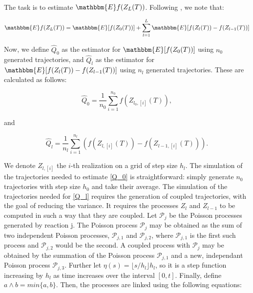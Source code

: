 \documentclass[ugrad,lot,lof,openright,11pt,oneside,onehalfspace]{RUthesis}
\begin{document}
		\\
		The task is to estimate $\mathbbm{E}f(Z_L(T))$. Following \cite{mlmc_applications}, we note that:

		\begin{equation}\label{telescope}
		\mathbbm{E}f(Z_L(T)) = \mathbbm{E} [ f(Z_0(T)) ] + \sum\limits_{l=1}^{L} \mathbbm{E} [ f(Z_l(T)) - f(Z_{l-1}(T))]
		\end{equation}

		\noindent
		Now, we define $\widehat{Q}_0$ as the estimator for $\mathbbm{E} [ f(Z_0(T)) ]$ using $n_0$ generated trajectories, and $\widehat{Q}_l$ as the estimator for $\mathbbm{E} [ f(Z_l(T)) - f(Z_{l-1}(T))]$ using $n_l$ generated trajectories. These are calculated as follows:

		\begin{equation}\label{Q_0}
		\widehat{Q}_0 = \frac{1}{n_0} \sum\limits_{i=1}^{n_0} f(Z_{l_0,[i]}(T)),
		\end{equation}

		\noindent
		and

		\begin{equation}\label{Q_l}
		\widehat{Q}_l = \frac{1}{n_l} \sum\limits_{i=1}^{n_l} ( f(Z_{l,[i]}(T)) - f(Z_{l-1,[i]}(T))  ).
		\end{equation}

		\noindent
		We denote $Z_{l,[i]}$ the $i$-th realization on a grid of step size $h_l$. The simulation of the trajectories needed to estimate \eqref{Q_0} is straightforward: simply generate $n_0$ trajectories with step size $h_0$ and take their average. The simulation of the trajectories needed for \eqref{Q_l} requires the generation of coupled trajectories, with the goal of reducing the variance. It requires the processes $Z_l$ and $Z_{l-1}$ to be computed in such a way that they are coupled. Let $\mathcal{P}_j$ be the Poisson processes generated by reaction j. The Poisson process $\mathcal{P}_j$ may be obtained as the sum of two independent Poisson processes, $\mathcal{P}_{j,1}$ and $\mathcal{P}_{j,2}$, where $\mathcal{P}_{j,1}$ is the first such process and $\mathcal{P}_{j,2}$ would be the second. A coupled process with $\mathcal{P}_j$ may be obtained by the summation of the Poisson process $\mathcal{P}_{j,1}$ and a new, independant Poisson process $\mathcal{P}_{j,3}$. Further let $\eta(s) = \lfloor s / h_l \rfloor h_l$, so it is a step function increasing by $h_l$ as time increases over the interval $[0,t]$. Finally, define $a \wedge b = min \{a,b\}$. Then, the processes are linked using the following equations:
\end{document}
